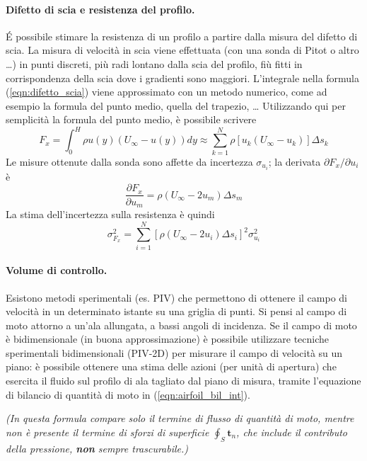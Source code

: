 \paragraph{Difetto di scia e resistenza del profilo.}
\'E possibile stimare la resistenza di un profilo a partire dalla misura del difetto di scia.
 La misura di velocità in scia viene effettuata (con una sonda di Pitot o altro \dots)
 in punti discreti, più radi lontano dalla scia del profilo,
 fiù fitti in corrispondenza della scia dove i gradienti sono maggiori.
L'integrale nella formula (\ref{eqn:difetto_scia}) viene approssimato con un metodo numerico,
 come ad esempio la formula del punto medio, quella del trapezio, \dots
Utilizzando qui per semplicità la formula del punto medio, è possibile scrivere
\begin{equation}
 F_x = \int_{0}^{H} \rho u(y) (U_\infty - u(y)) dy
    \approx \sum_{k=1}^{N} \rho \left[ u_k (U_\infty - u_k) \right] \Delta s_k
\end{equation}
Le misure ottenute dalla sonda sono affette da incertezza $\sigma_{u_i}$; la derivata $\partial F_x / \partial u_i$ è
\begin{equation}
 \dfrac{\partial F_x}{\partial u_m}  = \rho \left( U_\infty - 2 u_m \right) \Delta s_m
\end{equation}
La stima dell'incertezza sulla resistenza è quindi
\begin{equation}
 \sigma_{F_x}^2 = \sum_{i=1}^{N} \left[ \rho \left( U_\infty - 2 u_i \right) \Delta s_i \right]^2 \sigma_{u_i}^2
\end{equation}


\paragraph{Volume di controllo.}
Esistono metodi sperimentali (es. PIV) che permettono di ottenere il campo di velocità in un determinato istante
 su una griglia di punti.
Si pensi al campo di moto attorno a un'ala allungata, a bassi angoli di incidenza.
 Se il campo di moto è bidimensionale (in buona approssimazione) è possibile 
 utilizzare tecniche sperimentali bidimensionali (PIV-2D) per misurare il campo di velocità su un piano:
 è possibile ottenere una stima delle azioni (per unità di apertura) che esercita il fluido sul profilo
 di ala tagliato dal piano di misura, tramite l'equazione di bilancio di quantità di moto in (\ref{eqn:airfoil_bil_int}).

\vspace{0.2cm}
\textit{(In questa formula compare solo il termine di flusso di quantità di moto, mentre non è presente
 il termine di sforzi di superficie $\oint_S \bm{t}_n$, che include il contributo della pressione, \textbf{non}
 sempre trascurabile.)}
\vspace{0.2cm}

